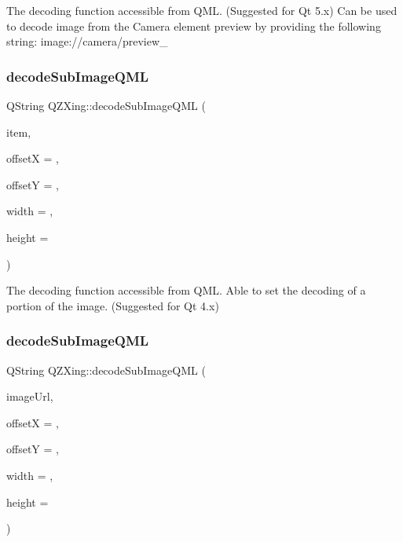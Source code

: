 The decoding function accessible from Q\+ML. (Suggested for Qt 5.\+x) Can be used to decode image from the Camera element preview by providing the following string\+: image\+://camera/preview\+\_ \mbox{\label{class_q_z_xing_a4fdb03f94072d9a47cc0d008967da49b}} 
\subsubsection{\texorpdfstring{decode\+Sub\+Image\+Q\+ML}{decodeSubImageQML}\hspace{0.1cm}{\footnotesize\ttfamily [1/2]}}
{\footnotesize\ttfamily Q\+String Q\+Z\+Xing\+::decode\+Sub\+Image\+Q\+ML (\begin{DoxyParamCaption}\item[{Q\+Object $\ast$}]{item,  }\item[{const int}]{offsetX = {},  }\item[{const int}]{offsetY = {},  }\item[{const int}]{width = {},  }\item[{const int}]{height = {} }\end{DoxyParamCaption})\hspace{0.3cm}{\ttfamily [slot]}}

The decoding function accessible from Q\+ML. Able to set the decoding of a portion of the image. (Suggested for Qt 4.\+x) \mbox{\label{class_q_z_xing_a13ef5bdf62f387df536e4a78088c5700}} 
\subsubsection{\texorpdfstring{decode\+Sub\+Image\+Q\+ML}{decodeSubImageQML}\hspace{0.1cm}{\footnotesize\ttfamily [2/2]}}
{\footnotesize\ttfamily Q\+String Q\+Z\+Xing\+::decode\+Sub\+Image\+Q\+ML (\begin{DoxyParamCaption}\item[{const Q\+Url \&}]{image\+Url,  }\item[{const int}]{offsetX = {},  }\item[{const int}]{offsetY = {},  }\item[{const int}]{width = {},  }\item[{const int}]{height = {} }\end{DoxyParamCaption})\hspace{0.3cm}{\ttfamily [slot]}}

